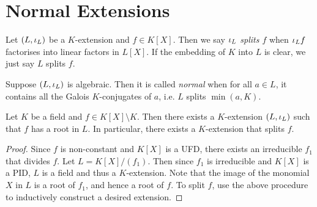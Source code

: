 \documentclass[main.tex]{subfiles}
\begin{document}
\section{Normal Extensions}

\begin{dfn}  
  
  Let $(L,\iota_L)$ be a $K$-extension and $f \in K[X]$. 
  Then we say \emph{$\iota_L$ splits $f$} when 
  $\iota_L f$ factorises into linear factors in $L[X]$. 
  If the embedding of $K$ into $L$ is clear, 
  we just say $L$ splits $f$. 

  Suppose $(L,\iota_L)$ is algebraic. 
  Then it is called \emph{normal} when for all $a \in L$,  
  it contains all the Galois $K$-conjugates of $a$,
  i.e. $L$ splits $\min(a,K)$. 
\end{dfn}

\begin{thm} 
  
  Let $K$ be a field and $f \in K[X] \setminus K$.
  Then there exists a $K$-extension $(L,\iota_L)$ such that
  $f$ has a root in $L$. 
  In particular, there exists a $K$-extension that splits $f$. 
\end{thm}
\begin{proof}
  Since $f$ is non-constant and $K[X]$ is a UFD, 
  there exists an irreducible $f_1$ that divides $f$.
  Let $L = K[X] / (f_1)$. 
  Then since $f_1$ is irreducible and $K[X]$ is a PID, 
  $L$ is a field and thus a $K$-extension. 
  Note that the image of the monomial $X$ in $L$ is a root of $f_1$,
  and hence a root of $f$.  
  To split $f$, use the above procedure to 
  inductively construct a desired extension.
\end{proof}
\end{document}

